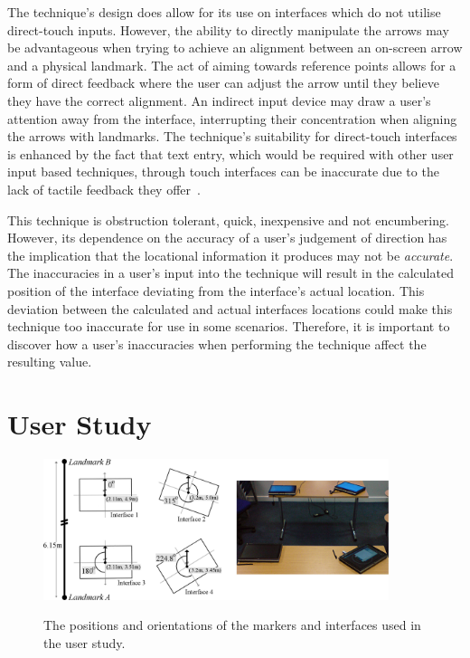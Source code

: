 \documentclass{bmcart}
\begin{document}
The technique's design does allow for its use on interfaces which do not utilise direct-touch inputs.
However, the ability to directly manipulate the arrows may be advantageous when trying to achieve an alignment between an on-screen arrow and a physical landmark. 
The act of aiming towards reference points allows for a form of direct feedback where the user can adjust the arrow until they believe they have the correct alignment.  
An indirect input device may draw a user's attention away from the interface, interrupting their concentration when aligning the arrows with landmarks.
The technique's suitability for direct-touch interfaces is enhanced by the fact that text entry, which would be required with other user input based techniques, through touch interfaces can be inaccurate due to the lack of tactile feedback they offer~\cite{Weiss2009}.

This technique is obstruction tolerant, quick, inexpensive and not encumbering.
However, its dependence on the accuracy of a user's judgement of direction has the implication that the locational information it produces may not be {\emph{accurate}}.
The inaccuracies in a user's input into the technique will result in the calculated position of the interface deviating from the interface's actual location.
This deviation between the calculated and actual interfaces locations could make this technique too inaccurate for use in some scenarios.
Therefore, it is important to discover how a user's inaccuracies when performing the technique affect the resulting value.

\section*{User Study}\label{sec:study}

\begin{figure}[ht]
  \centering
   \caption{The positions and orientations of the markers and interfaces used in the user study.}
  \includegraphics[width=0.9\textwidth]{figures/studyLayout.png}
   \label{fig:room}
\end{figure}
\end{document}
